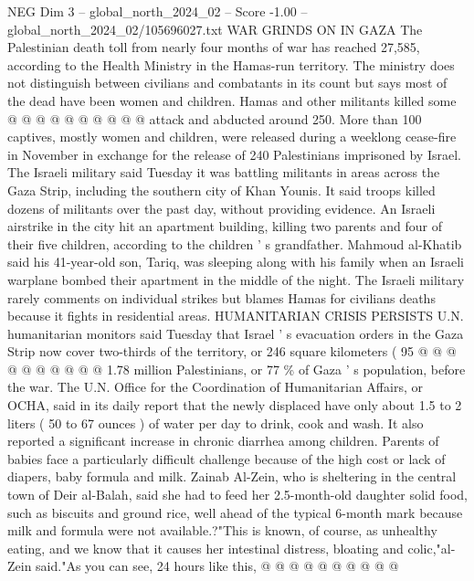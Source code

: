 \begin{textsample}{NEG Dim 3 – global\_north\_2024\_02 – Score -1.00 – global\_north\_2024\_02/105696027.txt}
WAR GRINDS ON IN GAZA The Palestinian death toll from nearly four months of war has reached 27,585, according to the Health Ministry in the Hamas-run territory.
The ministry does not distinguish between civilians and combatants in its count but says most of the dead have been women and children.
Hamas and other militants killed some @ @ @ @ @ @ @ @ @ @ attack and abducted around 250.
More than 100 captives, mostly women and children, were released during a weeklong cease-fire in November in exchange for the release of 240 Palestinians imprisoned by Israel.
The Israeli military said Tuesday it was battling militants in areas across the Gaza Strip, including the southern city of Khan Younis.
It said troops killed dozens of militants over the past day, without providing evidence.
An Israeli airstrike in the city hit an apartment building, killing two parents and four of their five children, according to the children ' s grandfather.
Mahmoud al-Khatib said his 41-year-old son, Tariq, was sleeping along with his family when an Israeli warplane bombed their apartment in the middle of the night.
The Israeli military rarely comments on individual strikes but blames Hamas for civilians deaths because it fights in residential areas.
HUMANITARIAN CRISIS PERSISTS U.N. humanitarian monitors said Tuesday that Israel ' s evacuation orders in the Gaza Strip now cover two-thirds of the territory, or 246 square kilometers ( 95 @ @ @ @ @ @ @ @ @ @ 1.78 million Palestinians, or 77 \% of Gaza ' s population, before the war.
The U.N.
Office for the Coordination of Humanitarian Affairs, or OCHA, said in its daily report that the newly displaced have only about 1.5 to 2 liters ( 50 to 67 ounces ) of water per day to drink, cook and wash.
It also reported a significant increase in chronic diarrhea among children.
Parents of babies face a particularly difficult challenge because of the high cost or lack of diapers, baby formula and milk.
Zainab Al-Zein, who is sheltering in the central town of Deir al-Balah, said she had to feed her 2.5-month-old daughter solid food, such as biscuits and ground rice, well ahead of the typical 6-month mark because milk and formula were not available.?"This is known, of course, as unhealthy eating, and we know that it causes her intestinal distress, bloating and colic,"al-Zein said."As you can see, 24 hours like this, @ @ @ @ @ @ @ @ @ @

\end{textsample}

